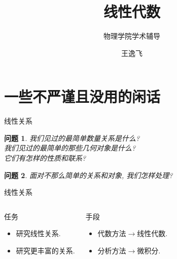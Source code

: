 \documentclass[11pt]{beamer}
\newtheorem{prob}{问题}[section]
\begin{document}
	\author{王逸飞}
	\title{线性代数}
	\subtitle{物理学院学术辅导}
\begin{frame}[plain]
	\titlepage
\end{frame}

\frame{\tableofcontents}

\section{一些不严谨且没用的闲话}
\frame{\sectionpage}

\begin{frame}{线性关系}
	\begin{prob}
		我们见过的最简单数量关系是什么?\\
		我们见过的最简单的那些几何对象是什么?\\
		它们有怎样的性质和联系?
	\end{prob}
	\begin{prob}
		面对不那么简单的关系和对象, 我们怎样处理?\\
	\end{prob}
\end{frame}

\begin{frame}{线性关系}
	\begin{columns}
		\begin{block}{任务}
			\begin{itemize}
				\item 研究线性关系.
				\item 研究更丰富的关系.
			\end{itemize}
		\end{block}
		\begin{block}{手段}
			\begin{itemize}
				\item 代数方法$\rightarrow$线性代数.
				\item 分析方法$\rightarrow$微积分.
			\end{itemize}
		\end{block}
	\end{columns}
\end{frame}
\end{document}

